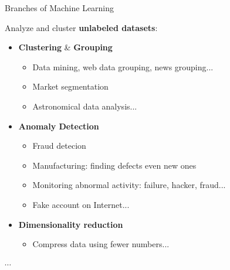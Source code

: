 \documentclass[10pt,serif,mathserif,compress,hyperref={colorlinks}]{beamer}
\begin{document}
\begin{frame}{Branches of Machine Learning}
  \begin{tcolorbox}[title=Unsupervised learning application]
    Analyze and cluster \textbf{unlabeled datasets}:
    \begin{itemize}
    \item \textbf{Clustering} \& \textbf{Grouping} 
      \begin{itemize}
      \item Data mining, web data grouping, news grouping...
      \item Market segmentation
      \item Astronomical data analysis...
      \end{itemize}        
    \item \textbf{Anomaly Detection}
      \begin{itemize}
      \item Fraud detecion
      \item Manufacturing: finding defects even new ones
      \item Monitoring abnormal activity: failure, hacker, fraud...
      \item Fake account on Internet...
      \end{itemize}
    \item \textbf{Dimensionality reduction}
      \begin{itemize}
      \item Compress data using fewer numbers...
      \end{itemize}
    \end{itemize}
    \vspace*{-1mm}$\cdots$
  \end{tcolorbox}    
\end{frame}
\end{document}
